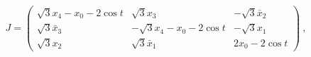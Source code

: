 \begin{equation}
J=\left(
\begin{array}{ccc}
\sqrt{3}x_{4}-x_{0}-2\cos t & \sqrt{3}x_{3} & -\sqrt{3}\bar{x}_{2} \\
\sqrt{3}\bar{x}_{3} & -\sqrt{3}x_{4}-x_{0}-2\cos t & -\sqrt{3}x_{1} \\
\sqrt{3}x_{2} & \sqrt{3}\bar{x}_{1} & 2x_{0}-2\cos t
\end{array}
\right) \ ,
\end{equation}

